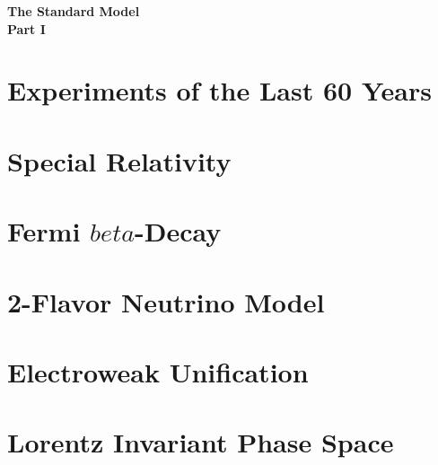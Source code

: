 \documentclass{report}
\begin{document}
  \begin{titlepage}
    \phantom{\,}
    \vfill
    \centering
    {\huge\textbf{The Standard Model}}\\
    \vspace{\parskip}
    {\Large\textbf{Part I}}
    \vspace{5em}
    \vfill
  \end{titlepage}

  

  \tableofcontents

  
  
  
  
  
  
  
  
  
  
  
  
  
  

  \appendix
  \chapter{Experiments of the Last 60 Years}
  

  \chapter{Special Relativity}
  

  \chapter{Fermi $beta$-Decay}
  

  \chapter{2-Flavor Neutrino Model}
  

  \chapter{Electroweak Unification}
  

  \chapter{Lorentz Invariant Phase Space}
  
\end{document}
